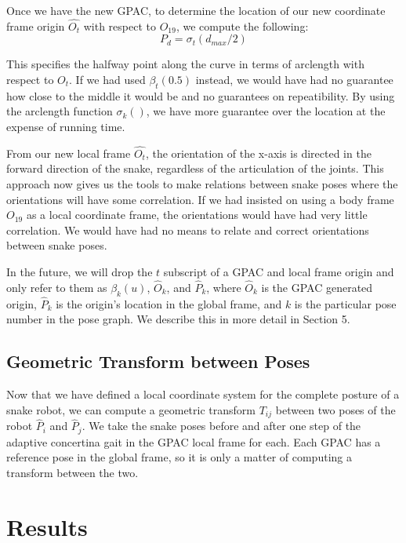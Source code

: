 Once we have the new GPAC, to determine the location of our new coordinate frame origin $\hat{O_t}$ with respect to $O_{19}$, we compute the following:
\begin{equation}
P_d = \sigma_t(d_{max} / 2)
\end{equation}

This specifies the halfway point along the curve in terms of arclength with respect to $O_t$.  If we had used $\beta_t(0.5)$ instead, we would have had no guarantee how close to the middle it would be and no guarantees on repeatibility.  By using the arclength function $\sigma_k()$, we have more guarantee over the location at the expense of running time.

From our new local frame $\hat{O_t}$, the orientation of the x-axis is directed in the forward direction of the snake, regardless of the articulation of the joints.  This approach now gives us the tools to make relations between snake poses where the orientations will have some correlation.  If we had insisted on using a body frame $O_{19}$ as a local coordinate frame, the orientations would have had very little correlation.  We would have had no means to relate and correct orientations between snake poses.

In the future, we will drop the $t$ subscript of a GPAC and local frame origin and only refer to them as $\beta_k(u)$, $\hat{O}_k$, and $\hat{P}_k$, where $\hat{O}_k$ is the  GPAC generated origin, $\hat{P}_k$ is the origin's location in the global frame, and $k$ is the particular pose number in the pose graph.  We describe this in more detail in Section 5.

\subsection{Geometric Transform between Poses}

\label{sec:geo_transform}

Now that we have defined a local coordinate system for the complete posture of a snake robot, we can compute a geometric transform $T_{ij}$ between two poses of the robot $\hat{P}_i$ and $\hat{P}_j$.  We take the snake poses before and after one step of the adaptive concertina gait in the GPAC local frame for each.  Each GPAC has a reference pose in the global frame, so it is only a matter of computing a transform between the two.

\section{Results}

